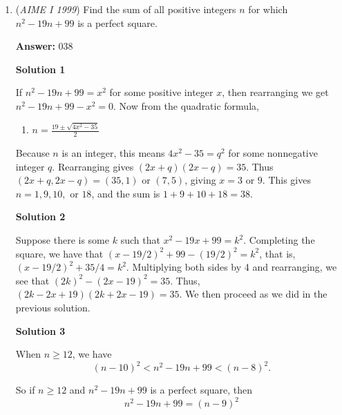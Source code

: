 \begin{enumerate}
 Solution by Ilikeapos

 



\textbf{Solution 4 (centroid) (fastest way)}

$(\Sigma x_i /4, \Sigma y_i /4)$ is the centroid, which generates $(19,99)$, so the answer is $\boxed{118}$. This is the fastest way because you do not need to find the opposite vertices by drawing.

 Solution by maxamc

 


	\item (\textit{AIME I 1999}) Find the sum of all positive integers $n$ for which $n^2-19n+99$ is a perfect square.


 
 \textbf{Answer: }038



\textbf{Solution 1}

If $n^2-19n+99=x^2$ for some positive integer $x$, then rearranging we get $n^2-19n+99-x^2=0$. Now from the quadratic formula, 

 
            \begin{enumerate}[label=(\roman*)]
                \item $n=\frac{19\pm \sqrt{4x^2-35}}{2}$
            \end{enumerate}
            Because $n$ is an integer, this means $4x^2-35=q^2$ for some nonnegative integer $q$. Rearranging gives $(2x+q)(2x-q)=35$. Thus $(2x+q, 2x-q)=(35, 1)$ or $(7,5)$, giving $x=3$ or $9$. This gives $n=1, 9, 10,$ or $18$, and the sum is $1+9+10+18=\boxed{38}$.

 



\textbf{Solution 2}

Suppose there is some $k$ such that $x^2 - 19x + 99 = k^2$. Completing the square, we have that $(x - 19/2)^2 + 99 - (19/2)^2 = k^2$, that is, $(x - 19/2)^2 + 35/4 = k^2$. Multiplying both sides by 4 and rearranging, we see that $(2k)^2 - (2x - 19)^2 = 35$. Thus, $(2k - 2x + 19)(2k + 2x - 19) = 35$. We then proceed as we did in the previous solution.

 



\textbf{Solution 3}

When $n \geq 12$, we have 
 \[(n-10)^2 < n^2 -19n + 99 < (n-8)^2.\]

 So if $n \geq 12$ and $n^2 -19n + 99$ is a perfect square, then 
 \[n^2 -19n + 99 = (n-9)^2\]


\end{enumerate}
